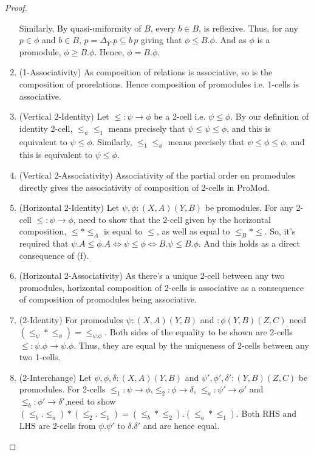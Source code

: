 \documentclass[18pt,a4paper]{article}
\makeatletter
\theoremstyle{definition}
\newcommand{\carrow}{}%
\DeclareRobustCommand{\carrow}{%
	\mathrel{\vphantom{\rightarrow}\mathpalette\circle@arrow\relax}%
}
\newcommand{\circle@arrow}[2]{%
	\m@th
	\ooalign{%
		\hidewidth$#1\circ\mkern1mu$\hidewidth\cr
	$#1\longrightarrow$\cr}%
}
\makeatother
\begin{document}
\begin{proof}
\begin{enumerate}[label=(\alph*)]
				Similarly, By quasi-uniformity of $B$, every $b \in B$, is
				reflexive. Thus, for any $p \in \phi$ and $b\in B$, $p=\Delta_Y.p\subseteq
				b\,p$ giving that $\phi \leq B.\phi$. And as $\phi$ is a promodule,
				$\phi \geq B.\phi$. Hence, $\phi=B.\phi$.
			\item (1-Associativity) As composition of relations is associative, so is the
				composition of prorelations. Hence composition of promodules i.e. 1-cells
				is associative.
			\item (Vertical 2-Identity) Let $\leq:\psi \to \phi$ be a 2-cell i.e.
				$\psi \leq \phi$. By our definition of identity 2-cell, $\leq_\psi \leq_1$
				means precisely that $\psi \leq \psi \leq \phi $, and this is equivalent to
				$\psi \leq \phi$. Similarly, $\leq_1 \leq_\phi$ means precisely that $\psi
				\leq \phi \leq \phi $, and this is equivalent to $\psi \leq \phi$.
			\item (Vertical 2-Associativity) Associativity of the partial order on promodules
				directly gives the associativity of composition of 2-cells in ProMod.
			\item (Horizontal 2-Identity) Let $\psi,\phi: (X,A)\carrow (Y,B)$ be promodules.
				For any 2-cell $\leq:\psi \to \phi $, need to show that the 2-cell given
				by the horizontal composition, $\leq*\leq_A$ is equal to $\leq$, as well as
				equal to $\leq_B *\leq$. So, it's required that $\psi.A \leq \phi.A
				\iff \psi \leq \phi \iff B.\psi \leq B.\phi$. And this holds as a
				direct consequence of (f).
			\item (Horizontal 2-Associativity) As there's a unique 2-cell between any two
				promodules, horizontal composition of 2-cells is associative as
				a consequence of composition of promodules being associative.
			\item (2-Identity) For promodules $\psi:(X,A)\carrow (Y,B)$ and
				$:\phi(Y,B) \carrow (Z,C)$ need $(\leq_\psi * \leq_\phi)=\leq_{\psi.\phi}$.
				Both sides of the equality to be shown are 2-cells $\leq:\psi.\phi
				\to \psi.\phi$.	Thus, they are equal by the uniqueness of 2-cells between
				any two 1-cells.
			\item (2-Interchange) Let $\psi,\phi,\delta:(X,A) \carrow (Y,B)$ and
				$\psi',\phi',\delta':(Y,B) \carrow (Z,C)$ be promodules. For
				2-cells $\leq_1:\psi \to \phi $,$\leq_2:\phi \to \delta $,
				$\leq_a:\psi' \to \phi' $ and $\leq_b:\phi' \to \delta'$,need to show
				$(\leq_b.\leq_a)*(\leq_2.\leq_1)=(\leq_b*\leq_2).(\leq_a*\leq_1)$.
				Both RHS and LHS are 2-cells from $\psi.\psi'$ to $\delta.\delta'$ and are
				hence equal.
		\end{enumerate}
	\end{proof}
\end{document}
